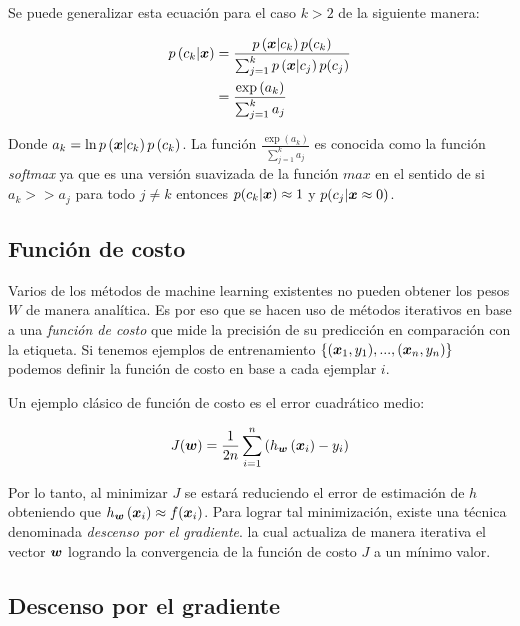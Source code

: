 Se puede generalizar esta ecuación para el caso $k > 2$ de la siguiente manera:

\begin{align}
    p\left( c_k | \boldsymbol{x} \right) &= \frac{p\left( \boldsymbol{x} | c_k \right)p(c_k)}{
                                                \sum_{j=1}^{k} p\left( \boldsymbol{x} |
                                                c_j \right) p(c_j) } \\
                                       &= \frac{\exp\left( a_k \right)}{\sum_{j=1}^{k} a_j} \\
\end{align}

Donde $a_k = \ln p\left( \boldsymbol{x} | c_k \right) p\left( c_k \right)$. La función
$\frac{\exp\left( a_k \right)}{\sum_{j=1}^{k} a_j}$ es conocida como la función
\emph{softmax} ya que es una versión suavizada de la función $max$ en el sentido
de si $a_k >> a_j$ para todo $j \neq k$ entonces $p(c_k | \boldsymbol{x}) \approx 1$ y
$p(c_j | \boldsymbol{x} \approx 0)$.

\subsection{Función de costo}

Varios de los métodos de machine learning existentes no pueden obtener los pesos
$W$ de manera analítica. Es por eso que se hacen uso de métodos iterativos en
base a una \emph{función de costo} que mide la precisión de su predicción en
comparación con la etiqueta. Si tenemos ejemplos de entrenamiento
$\{(\boldsymbol{x}_{1}, y_{1}), ..., (\boldsymbol{x}_{n}, y_{n})\}$ podemos definir la
función de costo en base a cada ejemplar $i$.

Un ejemplo clásico de función de costo es el error cuadrático medio:

\begin{align}
    J(\boldsymbol{w}) = \frac{1}{2n} \sum_{i=1}^{n}\left( h_{\boldsymbol{w}}\left( \boldsymbol{x}_{i}\right) - y_i \right)
\end{align}

Por lo tanto, al minimizar $J$ se estará reduciendo el error de estimación de
$h$ obteniendo que $h_{\boldsymbol{w}}\left( \boldsymbol{x}_{i} \right) \approx
f(\boldsymbol{x}_{i})$. Para lograr tal minimización, existe una técnica denominada
\emph{descenso por el gradiente}. la cual actualiza de manera iterativa el
vector $\boldsymbol{w}$ logrando la convergencia de la función de costo $J$ a un
mínimo valor.

\subsection{Descenso por el gradiente}

